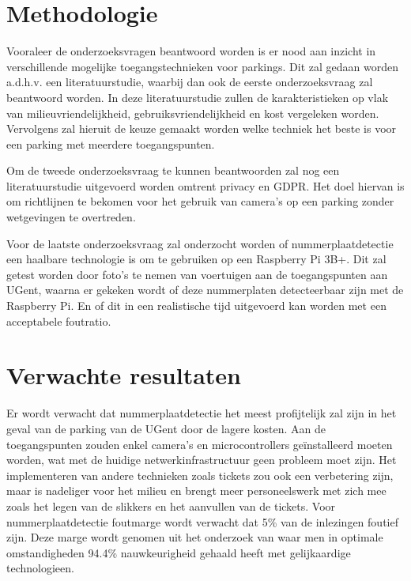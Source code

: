 
\section{Methodologie}
\label{sec:methodologie}

Vooraleer de onderzoeksvragen beantwoord worden is er nood aan inzicht in verschillende mogelijke toegangstechnieken voor parkings. Dit zal gedaan worden a.d.h.v. een literatuurstudie, waarbij dan ook de eerste onderzoeksvraag zal beantwoord worden. In deze literatuurstudie zullen de karakteristieken op vlak van milieuvriendelijkheid, gebruiksvriendelijkheid en kost vergeleken worden. Vervolgens zal hieruit de keuze gemaakt worden welke techniek het beste is voor een parking met meerdere toegangspunten.

Om de tweede onderzoeksvraag te kunnen beantwoorden zal nog een literatuurstudie uitgevoerd worden omtrent privacy en GDPR. Het doel hiervan is om richtlijnen te bekomen voor het gebruik van camera’s op een parking zonder wetgevingen te overtreden.

Voor de laatste onderzoeksvraag zal onderzocht worden of nummerplaatdetectie een haalbare technologie is om te gebruiken op een Raspberry Pi 3B+. Dit zal getest worden door foto’s te nemen van voertuigen aan de toegangspunten aan UGent, waarna er gekeken wordt of deze nummerplaten detecteerbaar zijn met de Raspberry Pi. En of dit in een realistische tijd uitgevoerd kan worden met een acceptabele foutratio.

\section{Verwachte resultaten}
\label{sec:verwachte_resultaten}

Er wordt verwacht dat nummerplaatdetectie het meest profijtelijk zal zijn in het geval van de parking van de UGent door de lagere kosten. Aan de toegangspunten zouden enkel camera’s en microcontrollers geïnstalleerd moeten worden, wat met de huidige netwerkinfrastructuur geen probleem moet zijn. Het implementeren van andere technieken zoals tickets zou ook een verbetering zijn, maar is nadeliger voor het milieu en brengt meer personeelswerk met zich mee zoals het legen van de slikkers en het aanvullen van de tickets. Voor nummerplaatdetectie foutmarge wordt verwacht dat 5\% van de inlezingen foutief zijn. Deze marge wordt genomen uit het onderzoek van \textcite{figuerola2016automated} waar men in optimale omstandigheden 94.4\% nauwkeurigheid gehaald heeft met gelijkaardige technologieen.

